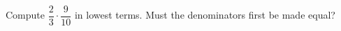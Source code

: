 Compute $\dfrac{2}{3}\cdot\dfrac{9}{10}$ in lowest terms. Must the denominators first be made equal?
